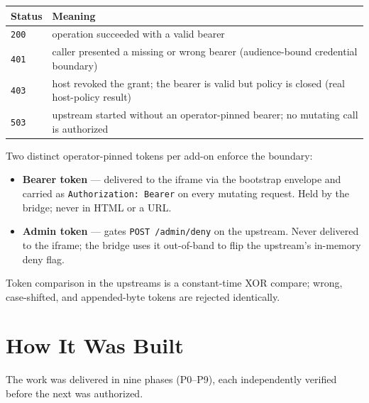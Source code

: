 \documentclass[11pt]{article}
\begin{document}
\begin{center}
\begin{tabular}{@{}p{4.6cm}p{7.6cm}@{}}
\toprule
\textbf{Status} & \textbf{Meaning} \\
\midrule
\texttt{200} & operation succeeded with a valid bearer \\
\texttt{401} & caller presented a missing or wrong bearer (audience-bound credential boundary) \\
\texttt{403} & host revoked the grant; the bearer is valid but policy is closed (real host-policy result) \\
\texttt{503} & upstream started without an operator-pinned bearer; no mutating call is authorized \\
\bottomrule
\end{tabular}
\end{center}

Two distinct operator-pinned tokens per add-on enforce the boundary:

\begin{itemize}[leftmargin=1.5em]
  \item \textbf{Bearer token} --- delivered to the iframe via the bootstrap
        envelope and carried as \texttt{Authorization: Bearer} on every
        mutating request. Held by the bridge; never in HTML or a URL.
  \item \textbf{Admin token} --- gates \texttt{POST /admin/deny} on the
        upstream. Never delivered to the iframe; the bridge uses it
        out-of-band to flip the upstream's in-memory deny flag.
\end{itemize}

Token comparison in the upstreams is a constant-time XOR compare; wrong,
case-shifted, and appended-byte tokens are rejected identically.

\section{How It Was Built}

The work was delivered in nine phases (P0--P9), each independently verified
before the next was authorized.
\end{document}
